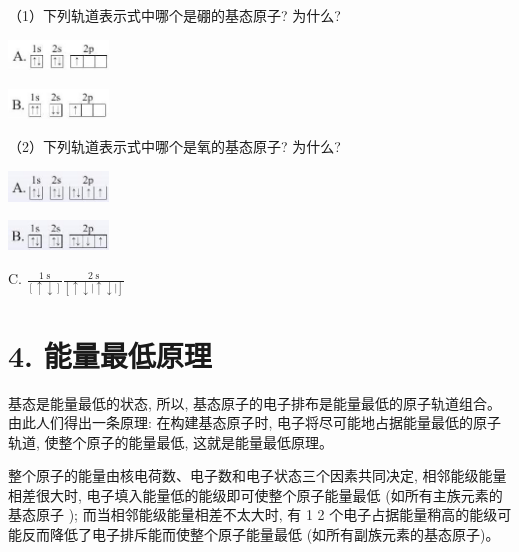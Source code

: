 \documentclass[10pt]{article}
\begin{document}
（1）下列轨道表示式中哪个是硼的基态原子? 为什么?

\begin{center}
\includegraphics[max width=0.2\textwidth]{images/0190e026-5a11-7df7-bd27-54d09026ba7a_19_950847.jpg}
\end{center}

\begin{center}
\includegraphics[max width=0.2\textwidth]{images/0190e026-5a11-7df7-bd27-54d09026ba7a_19_200919.jpg}
\end{center}

（2）下列轨道表示式中哪个是氧的基态原子? 为什么?

\begin{center}
\includegraphics[max width=0.2\textwidth]{images/0190e026-5a11-7df7-bd27-54d09026ba7a_19_769393.jpg}
\end{center}

\begin{center}
\includegraphics[max width=0.2\textwidth]{images/0190e026-5a11-7df7-bd27-54d09026ba7a_19_899274.jpg}
\end{center}

C. \(\frac{1\mathrm{\;s}}{\left\lbrack \uparrow \downarrow \right\rbrack }\frac{2\mathrm{\;s}}{\left\lbrack \uparrow \downarrow \left| \uparrow \downarrow \right| \right\rbrack }\)

\section*{4. 能量最低原理}

基态是能量最低的状态, 所以, 基态原子的电子排布是能量最低的原子轨道组合。由此人们得出一条原理: 在构建基态原子时, 电子将尽可能地占据能量最低的原子轨道, 使整个原子的能量最低, 这就是能量最低原理。

整个原子的能量由核电荷数、电子数和电子状态三个因素共同决定, 相邻能级能量相差很大时, 电子填入能量低的能级即可使整个原子能量最低 (如所有主族元素的基态原子 ); 而当相邻能级能量相差不太大时, 有 1 2 个电子占据能量稍高的能级可能反而降低了电子排斥能而使整个原子能量最低 (如所有副族元素的基态原子)。
\end{document}

